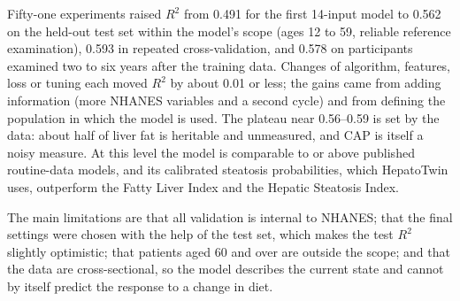 Fifty-one experiments raised $R^2$ from 0.491 for the first 14-input model to
0.562 on the held-out test set within the model's scope (ages 12 to 59,
reliable reference examination), 0.593 in repeated cross-validation, and 0.578
on participants examined two to six years after the training data. Changes of
algorithm, features, loss or tuning each moved $R^2$ by about 0.01 or less;
the gains came from adding information (more NHANES variables and a second
cycle) and from defining the population in which the model is used. The
plateau near 0.56--0.59 is set by the data: about half of liver fat is
heritable and unmeasured, and CAP is itself a noisy measure. At this level the
model is comparable to or above published routine-data models, and its
calibrated steatosis probabilities, which HepatoTwin uses, outperform the
Fatty Liver Index and the Hepatic Steatosis Index.

The main limitations are that all validation is internal to NHANES; that the
final settings were chosen with the help of the test set, which makes the test
$R^2$ slightly optimistic; that patients aged 60 and over are outside the
scope; and that the data are cross-sectional, so the model describes the
current state and cannot by itself predict the response to a change in diet.
